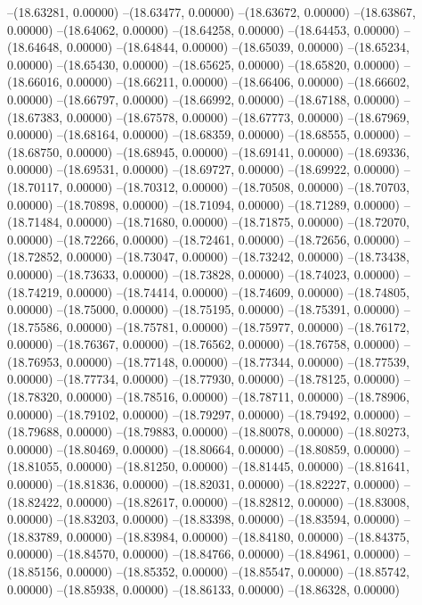 --(18.63281, 0.00000)
--(18.63477, 0.00000)
--(18.63672, 0.00000)
--(18.63867, 0.00000)
--(18.64062, 0.00000)
--(18.64258, 0.00000)
--(18.64453, 0.00000)
--(18.64648, 0.00000)
--(18.64844, 0.00000)
--(18.65039, 0.00000)
--(18.65234, 0.00000)
--(18.65430, 0.00000)
--(18.65625, 0.00000)
--(18.65820, 0.00000)
--(18.66016, 0.00000)
--(18.66211, 0.00000)
--(18.66406, 0.00000)
--(18.66602, 0.00000)
--(18.66797, 0.00000)
--(18.66992, 0.00000)
--(18.67188, 0.00000)
--(18.67383, 0.00000)
--(18.67578, 0.00000)
--(18.67773, 0.00000)
--(18.67969, 0.00000)
--(18.68164, 0.00000)
--(18.68359, 0.00000)
--(18.68555, 0.00000)
--(18.68750, 0.00000)
--(18.68945, 0.00000)
--(18.69141, 0.00000)
--(18.69336, 0.00000)
--(18.69531, 0.00000)
--(18.69727, 0.00000)
--(18.69922, 0.00000)
--(18.70117, 0.00000)
--(18.70312, 0.00000)
--(18.70508, 0.00000)
--(18.70703, 0.00000)
--(18.70898, 0.00000)
--(18.71094, 0.00000)
--(18.71289, 0.00000)
--(18.71484, 0.00000)
--(18.71680, 0.00000)
--(18.71875, 0.00000)
--(18.72070, 0.00000)
--(18.72266, 0.00000)
--(18.72461, 0.00000)
--(18.72656, 0.00000)
--(18.72852, 0.00000)
--(18.73047, 0.00000)
--(18.73242, 0.00000)
--(18.73438, 0.00000)
--(18.73633, 0.00000)
--(18.73828, 0.00000)
--(18.74023, 0.00000)
--(18.74219, 0.00000)
--(18.74414, 0.00000)
--(18.74609, 0.00000)
--(18.74805, 0.00000)
--(18.75000, 0.00000)
--(18.75195, 0.00000)
--(18.75391, 0.00000)
--(18.75586, 0.00000)
--(18.75781, 0.00000)
--(18.75977, 0.00000)
--(18.76172, 0.00000)
--(18.76367, 0.00000)
--(18.76562, 0.00000)
--(18.76758, 0.00000)
--(18.76953, 0.00000)
--(18.77148, 0.00000)
--(18.77344, 0.00000)
--(18.77539, 0.00000)
--(18.77734, 0.00000)
--(18.77930, 0.00000)
--(18.78125, 0.00000)
--(18.78320, 0.00000)
--(18.78516, 0.00000)
--(18.78711, 0.00000)
--(18.78906, 0.00000)
--(18.79102, 0.00000)
--(18.79297, 0.00000)
--(18.79492, 0.00000)
--(18.79688, 0.00000)
--(18.79883, 0.00000)
--(18.80078, 0.00000)
--(18.80273, 0.00000)
--(18.80469, 0.00000)
--(18.80664, 0.00000)
--(18.80859, 0.00000)
--(18.81055, 0.00000)
--(18.81250, 0.00000)
--(18.81445, 0.00000)
--(18.81641, 0.00000)
--(18.81836, 0.00000)
--(18.82031, 0.00000)
--(18.82227, 0.00000)
--(18.82422, 0.00000)
--(18.82617, 0.00000)
--(18.82812, 0.00000)
--(18.83008, 0.00000)
--(18.83203, 0.00000)
--(18.83398, 0.00000)
--(18.83594, 0.00000)
--(18.83789, 0.00000)
--(18.83984, 0.00000)
--(18.84180, 0.00000)
--(18.84375, 0.00000)
--(18.84570, 0.00000)
--(18.84766, 0.00000)
--(18.84961, 0.00000)
--(18.85156, 0.00000)
--(18.85352, 0.00000)
--(18.85547, 0.00000)
--(18.85742, 0.00000)
--(18.85938, 0.00000)
--(18.86133, 0.00000)
--(18.86328, 0.00000)
